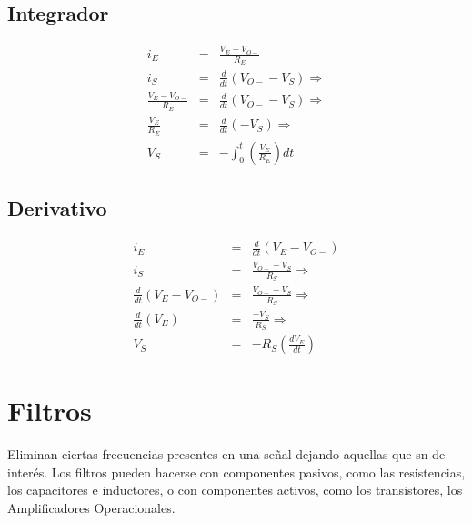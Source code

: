 \documentclass[12pt,spanish,lettersize]{report}
\begin{document}
\subsection{Integrador}
\begin{eqnarray}
i_E&=&\frac{V_E-V_{O-}}{R_E}\\
i_S&=&\frac{d}{dt}(V_{O-}-V_S)\Rightarrow\\
\frac{V_E-V_{O-}}{R_E}&=&\frac{d}{dt}(V_{O-}-V_S)\Rightarrow\\
\frac{V_E}{R_E}&=&\frac{d}{dt}(-V_S)\Rightarrow\\
V_S&=&-\int_0^t\left(\frac{V_E}{R_E}\right)dt
\end{eqnarray}
\subsection{Derivativo}
\begin{eqnarray}
i_E&=&\frac{d}{dt}(V_E-V_{O-})\\
i_S&=&\frac{V_{O-}-V_S}{R_S}\Rightarrow\\
\nonumber\frac{d}{dt}(V_E-V_{O-})&=&\frac{V_{O-}-V_S}{R_S}\Rightarrow\\
\frac{d}{dt}(V_E)&=&\frac{-V_S}{R_S}\Rightarrow\\
V_S&=&-R_S\left(\frac{dV_E}{dt}\right)
\end{eqnarray}
\section{Filtros}
Eliminan ciertas frecuencias presentes en una se\~nal dejando aquellas que sn de inter\'es. Los filtros pueden hacerse con componentes pasivos, como las resistencias, los capacitores e inductores, o con componentes activos, como los transistores, los Amplificadores Operacionales.
\end{document}
